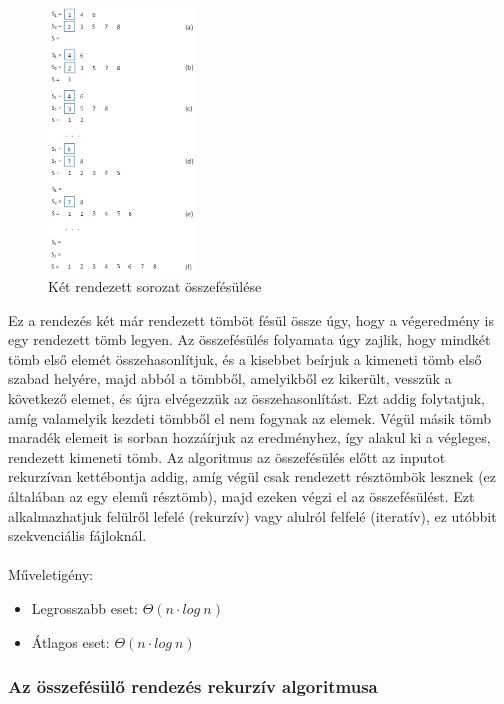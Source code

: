 \documentclass[12pt,margin=0px]{article}
\begin{document}
	\begin{figure}[H]
		\centering
		\includegraphics[width=0.35\textwidth]{img/merge_sort_sample.png}
		\caption{Két rendezett sorozat összefésülése}
	\end{figure}

    \noindent Ez a rendezés két már rendezett tömböt fésül össze úgy, hogy a végeredmény is egy rendezett tömb legyen. Az összefésülés folyamata úgy zajlik, hogy mindkét tömb első elemét összehasonlítjuk, és a kisebbet beírjuk a kimeneti tömb első szabad helyére, majd abból  a tömbből, amelyikből ez kikerült, vesszük a következő elemet, és újra elvégezzük az összehasonlítást. Ezt addig folytatjuk, amíg valamelyik kezdeti tömbből el nem fogynak az elemek. Végül másik tömb maradék elemeit is sorban hozzáírjuk az eredményhez, így alakul ki a végleges, rendezett kimeneti tömb. Az algoritmus az összefésülés előtt az inputot rekurzívan kettébontja addig, amíg végül csak rendezett résztömbök lesznek (ez általában az egy elemű résztömb), majd ezeken végzi el az összefésülést. 	Ezt alkalmazhatjuk felülről lefelé (rekurzív) vagy alulról felfelé (iteratív), ez utóbbit szekvenciális fájloknál.\\\\

    \noindent Műveletigény:
    \begin{itemize}
        \item Legrosszabb eset: $\Theta(n \cdot log\ n)$
        \item Átlagos eset: $\Theta(n \cdot log\ n)$
    \end{itemize}

    \subsubsection*{Az összefésülő rendezés rekurzív algoritmusa}
\end{document}

